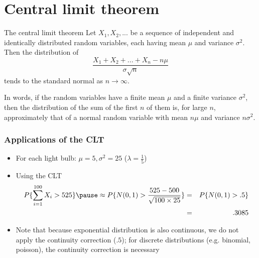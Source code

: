 \documentclass[slidestop,compress,mathserif]{beamer}
\begin{document}
\section{Central limit theorem}
\begin{frame}
\begin{block}{The central limit theorem}
Let $X_1, X_2, ...$ be a sequence of independent and identically distributed random variables, each having mean $\mu$ and variance $\sigma^2$. Then the distribution of
$$\frac{X_1 + X_2 + ... + X_n - n\mu}{\sigma \sqrt{n}}$$
tends to the standard normal as $n \to \infty$. 
\end{block}
\pause
\vspace{5mm}
In words, if the random variables have a finite mean $\mu$ and a finite variance $\sigma^2$, then the distribution of the sum of the first $n$ of them is, for large $n$, approximately that of a normal random variable with mean $n\mu$ and variance $n\sigma^2$.
\end{frame}

\begin{frame}\frametitle{Applications of the CLT}
\pause
\begin{itemize}
\item For each light bulb: $\mu = 5, \sigma^2 = 25$ ($\lambda = \frac{1}{5}$)
\pause
\item Using the CLT
\begin{eqnarray*}
P\{\sum_{i=1}^{100}X_i > 525\} \pause \approx P\{N(0, 1) > \frac{525 - 500}{\sqrt{100\times 25}}\} &=& P\{N(0, 1) > .5\} \\
&=&
 .3085
\end{eqnarray*}
\pause
\item Note that because exponential distribution is also continuous, we do not apply the continuity correction ($.5$); for discrete distributions (e.g. binomial, poisson), the continuity correction is necessary
\end{itemize}

\end{frame}
\end{document}
